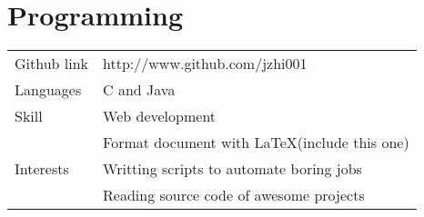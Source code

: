 \documentclass[12pt,a4paper]{article}
\begin{document}
\section{Programming}\noindent
\begin{tabular}{p{4.5cm} l}
	Github link
		& http://www.github.com/jzhi001\\ 
	Languages 
		& C and Java\\
	Skill 
		& Web development\\
		& Format document with \LaTeX (include this one)\\
	Interests 
		& Writting scripts to automate boring jobs\\
		& Reading source code of awesome projects
\end{tabular}
\end{document}

